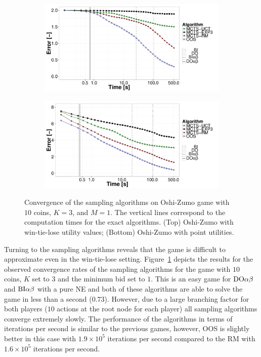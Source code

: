 \begin{figure}[t!]
\centering
	\begin{subfigure}{0.85\textwidth}
		\includegraphics[width=1\textwidth]{figures/convergence-oz.pdf}
	\end{subfigure}
	\begin{subfigure}{0.85\textwidth}
		\includegraphics[width=1\textwidth]{figures/convergence-oz-bf.pdf}
	\end{subfigure}
\caption{Convergence of the sampling algorithms on Oshi-Zumo game with $10$ coins, $K=3$, and $M=1$. The vertical lines correspond to the computation times for the exact algorithms.
(Top) Oshi-Zumo with win-tie-lose utility values;
(Bottom) Oshi-Zumo with point utilities.} \label{fig:off:conv:oz}
\end{figure}

Turning to the sampling algorithms reveals that the game is difficult to approximate even in the win-tie-lose setting.
Figure~\ref{fig:off:conv:oz} depicts the results for the observed 
convergence rates of the sampling algorithms for the game with $10$ coins, $K$ set to $3$ and the minimum bid set to $1$. This is an easy game for $\textrm{DO}\alpha\beta$ and $\textrm{BI}\alpha\beta$ with a pure NE and both of these algorithms are able to solve the game in less than a second ($0.73$). However, due to a large branching factor for both players ($10$ actions at the root node for each player) all sampling algorithms converge extremely slowly. The performance of the algorithms in terms of iterations per second is similar to the previous games, however, OOS is slightly better in this case with $1.9\times10^5$ iterations per second compared to the RM with $1.6\times10^5$ iterations per second.

